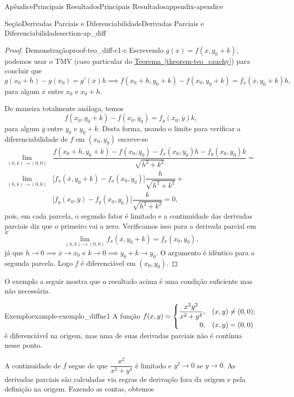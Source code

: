 \documentclass[oneside,10pt,]{book}
\newcommand{\xreffont}{\relax}
\numberwithin{equation}{section}
\begin{document}
\begin{appendixptx}{Apêndice}{Principais Resultados}{}{Principais Resultados}{}{}{appendix-apendice}
\begin{sectionptx}{Seção}{Derivadas Parciais e Diferenciabilidade}{}{Derivadas Parciais e Diferenciabilidade}{}{}{section-ap_diff}
\begin{proof}{Demonstração}{}{proof-teo_diff-c1-c}
Escrevendo \(g(x)=f(x,y_0+k)\), podemos usar o TMV (caso particular do \hyperref[theorem-teo_cauchy]{Teorema~{\xreffont\ref{theorem-teo_cauchy}}}) para concluir que%
\begin{equation*}
g(x_0+h)-g(x_0)=g'(\overline{x})h\implies
f(x_0+h,y_0+k)-f(x_0,y_0+k) = f_x(\overline{x},y_0+k)h,
\end{equation*}
para algum \(\overline{x}\) entre \(x_0\) e \(x_0+h\).%
\par
De maneira totalmente análoga, temos%
\begin{equation*}
f(x_0,y_0+k)-f(x_0,y_0) = f_y(x_0,\overline{y})k,
\end{equation*}
para algum \(\overline{y}\) entre \(y_0\) e \(y_0+k\). Desta forma, usando o limite para verificar a diferenciabilidade de \(f\) em \((x_0,y_0)\) escreve-se%
\begin{align*}
\lim\limits_{(h,k)\to(0,0)}&
\dfrac{f(x_0+h,y_0+k)-f(x_0,y_0)-f_x(x_0,y_0)h-f_y(x_0,y_0)k}
{\sqrt{h^2+k^2}}=\\
\lim\limits_{(h,k)\to(0,0)}&
\Big[f_x(\overline{x},y_0+k)-f_x(x_0,y_0)\Big]
\dfrac{h}{\sqrt{h^2+k^2}}+\\
&
\Big[f_y(x_0,\overline{y})-f_y(x_0,y_0)\Big]
\dfrac{k}{\sqrt{h^2+k^2}}=0,
\end{align*}
pois, em cada parcela, o segundo fator é limitado e a continuidade das derivadas parciais diz que o primeiro vai a zero. Verificamos isso para a derivada parcial em \(x\)%
\begin{equation*}
\lim\limits_{(h,k)\to(0,0)}f_x(\overline{x},y_0+k)=f_x(x_0,y_0),
\end{equation*}
já que \(h\to 0\implies \overline{x}\to x_0\) e \(k\to
0\implies y_0+k\to y_0\). O argumento é idêntico para a segunda parcela. Logo \(f\) é diferenciável em \((x_0,y_0)\).%
\end{proof}
O exemplo a seguir mostra que o resultado acima é uma condição suficiente mas não necessária.%
\begin{example}{Exemplo}{}{example-exemplo_diffnc1}%
A função \(f(x,y)=\begin{cases}
\dfrac{x^2y^2}{x^2+y^4},&(x,y)\neq (0,0);\\ \hfill 0,&
(x,y)=(0,0)\end{cases}\) é diferenciável na origem, mas uma de suas derivadas parciais não é contínua nesse ponto.%
\par
A continuidade de \(f\) segue de que \(\dfrac{x^2}{x^2+y^4}\) é limitado e \(y^2\to 0\) se \(y\to
0\). As derivadas parciais são calculadas via regras de derivação fora da origem e pela definição na origem. Fazendo as contas, obtemos%

\end{example}
\end{sectionptx}
\end{appendixptx}
\end{document}
